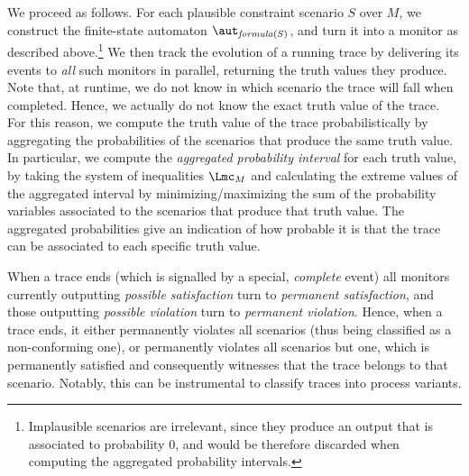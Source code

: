 We proceed as follows. For each plausible constraint scenario $S$ over $M$, we construct the finite-state automaton $\aut_{\formula{S}}$, and turn it into a monitor as described above.\footnote{Implausible scenarios are irrelevant, since they produce an output that is associated to probability $0$, and would be therefore discarded when computing the aggregated probability intervals.} We then track the evolution of a running trace by delivering its events to \emph{all} such monitors in parallel, returning the truth values they produce. Note that, at runtime, we do not know in which scenario the trace will fall when completed. Hence, we actually do not know the exact truth value of the trace. For this reason, we compute the truth value of the trace probabilistically by aggregating the probabilities of the scenarios that produce the same truth value. In particular, we compute the \emph{aggregated probability interval} for each truth value, by taking the system of inequalities $\Lmc_M$ and calculating the extreme values of the aggregated interval by minimizing/maximizing the sum of the probability variables associated to the scenarios that produce that truth value. The aggregated probabilities give an indication of how probable it is that the trace can be associated to each specific truth value.

When a trace ends (which is signalled by a special, \emph{complete} event) all monitors currently outputting \emph{possible satisfaction} turn to \emph{permanent satisfaction}, and those outputting \emph{possible violation} turn to \emph{permanent violation}. Hence, when a trace ends, it either permanently violates all scenarios (thus being classified as a non-conforming one), or permanently violates all scenarios but one, which is permanently satisfied and consequently witnesses that the trace belongs to that scenario. Notably, this can be instrumental to classify traces into process variants.



